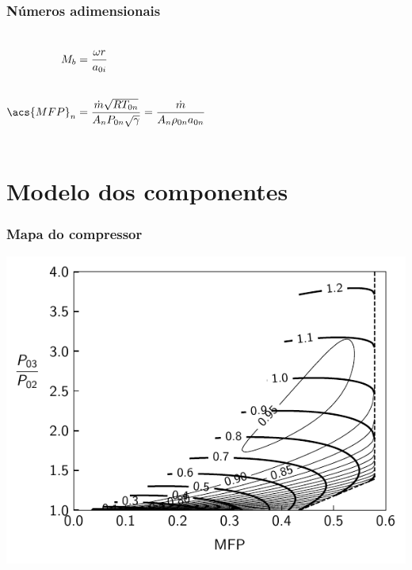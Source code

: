 \documentclass[aspectratio=1610]{beamer}
\begin{document}
\begin{frame}
    \frametitle{Números adimensionais}
    
    \begin{columns}
        \begin{align*}
            M_b &= \frac{\omega r}{a_{0i}} \\[2em]
            \acs{MFP}_n &= \MFP{n} = \MFPalt{n} 
        \end{align*}
        
    \end{columns}
\end{frame}

\section{Modelo dos componentes} %
\begin{frame}
    \frametitle{Mapa do compressor}
    \centering
    \includegraphics{fig/compressor_map}
\end{frame}
\end{document}
